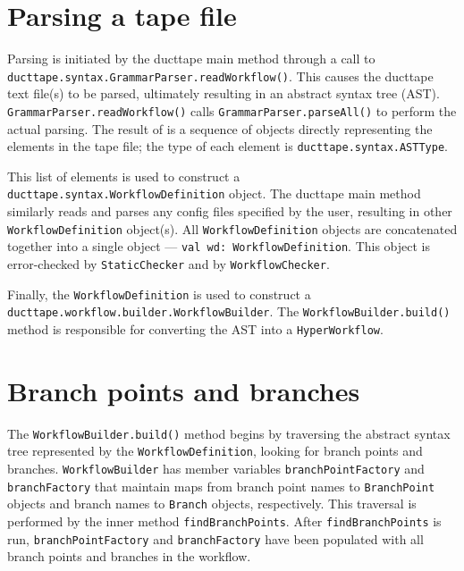 \documentclass{report}
\begin{document}
\section{Parsing a tape file}

Parsing is initiated by the ducttape main method through a call to \texttt{ducttape.syntax.\-GrammarParser.readWorkflow()}.
%
This causes the ducttape text file(s) to be parsed, ultimately resulting in an abstract syntax tree (AST).
%
\texttt{GrammarParser.readWorkflow()} calls \texttt{GrammarParser.parseAll()} to perform the actual parsing.
%
The result of is a sequence of objects directly representing the elements in the tape file;
the type of each element is \texttt{ducttape.syntax.ASTType}.

This list of elements is used to construct a \texttt{ducttape.syntax.WorkflowDefinition} object.
%
The ducttape main method similarly reads and parses any config files specified by the user, resulting in other \texttt{WorkflowDefinition} object(s).
%
All \texttt{WorkflowDefinition} objects are concatenated together into a single object --- \texttt{val wd: WorkflowDefinition}.
%
This object is error-checked by \texttt{StaticChecker} and by \texttt{WorkflowChecker}.

Finally, the \texttt{WorkflowDefinition} is used to construct a \texttt{ducttape.workflow.\-builder.WorkflowBuilder}.
%
The \texttt{WorkflowBuilder.build()} method is responsible for converting the AST into a \texttt{HyperWorkflow}.



\section{Branch points and branches}
\label{sec:branchpoints_branches}
The \texttt{WorkflowBuilder.build()} method begins by traversing the abstract syntax tree represented by the \texttt{WorkflowDefinition}, looking for branch points and branches.
%
\texttt{WorkflowBuilder} has member variables \texttt{branchPointFactory} and \texttt{branchFactory} that maintain maps from branch point names to \texttt{BranchPoint} objects and branch names to \texttt{Branch} objects, respectively.
%
This traversal is performed by the inner method \texttt{findBranchPoints}.
%
After \texttt{findBranchPoints} is run, \texttt{branchPointFactory} and \texttt{branchFactory} have been populated with all branch points and branches in the workflow.
\end{document}
